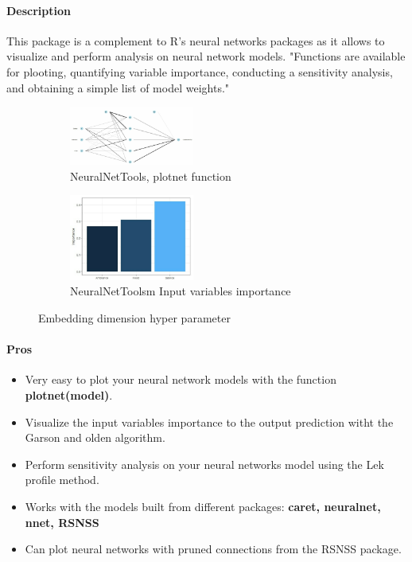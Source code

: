 \documentclass[6pt,letter]{article}\usepackage[]{graphicx}\usepackage[]{color}
\begin{document}
\paragraph{Description}
This package is a complement to R's neural networks packages as it allows to visualize and perform analysis on neural network models. "Functions are available for plooting, quantifying variable importance, conducting a sensitivity analysis, and obtaining a simple list of model weights."
\begin{figure}[H]
  \begin{subfigure}{0.5\textwidth}
    \centering\includegraphics[width=0.45\textwidth]{figure/plotnet.png}
    \caption{NeuralNetTools, plotnet function}
  \end{subfigure}
  \begin{subfigure}{0.5\textwidth}
    \centering\includegraphics[width=0.45\textwidth]{figure/garson_algorithm.png}
    \caption{NeuralNetToolsm Input variables importance}
  \end{subfigure}
    \caption{Embedding dimension hyper parameter}
\end{figure}

\paragraph{Pros}
\begin{itemize}
\item Very easy to plot your neural network models with the function \textbf{plotnet(model)}.
\item Visualize the input variables importance to the output prediction witht the Garson and olden algorithm.
\item Perform sensitivity analysis on your neural networks model using the Lek profile method.
\item Works with the models built from different packages: \textbf{caret, neuralnet, nnet, RSNSS}
\item Can plot neural networks with pruned connections from the RSNSS package.
\end{itemize}
\end{document}
